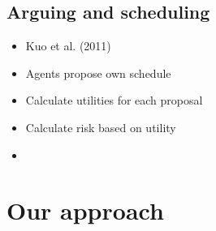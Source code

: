 \documentclass{beamer}
\begin{document}
\subsection{Arguing and scheduling}
\begin{frame}
\begin{itemize}
\item Kuo et al. (2011)
\item Agents propose own schedule
\item Calculate utilities for each proposal
\item Calculate risk based on utility
\item 

\end{itemize}
\end{frame}

\section{Our approach}
\end{document}
